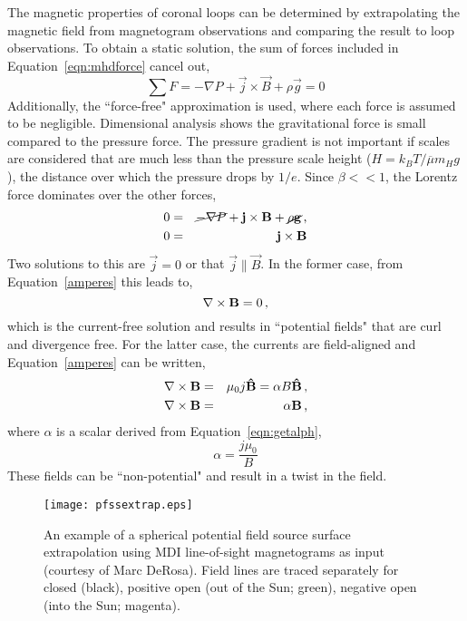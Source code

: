 The magnetic properties of coronal loops can be determined by extrapolating the magnetic field from magnetogram observations and comparing the result to loop observations. To obtain a static solution, the sum of forces included in Equation~\ref{eqn:mhdforce} cancel out, 
\begin{equation}
\sum F = -\nabla P + \vec{j} \times \vec{B} +\rho \vec{g} = 0  
\end{equation}
Additionally, the ``force-free" approximation is used, where each force is assumed to be negligible.  Dimensional analysis shows the gravitational force is small compared to the pressure force. The pressure gradient is not important if scales are considered that are much less than the pressure scale height ($H=k_B T/\overline{\mu} m_H g$), the distance over which the pressure drops by $1/e$. Since $\beta << 1$, the Lorentz force dominates over the other forces, 
\begin{eqnarray}
0 &=& \cancel{-\nabla P} + \vec{j} \times \vec{B} +\cancel{\rho \vec{g}} \mbox{\,,} \\
0 &=& \vec{j} \times \vec{B}  
\end{eqnarray}
Two solutions to this are $\vec{j}=0$ or that $\vec{j} \parallel \vec{B}$. In the former case, from Equation~\ref{amperes} this leads to,
\begin{equation}
\nabla \times \vec{B} =0 \mbox{\,,}
\end{equation}
which is the current-free solution and results in ``potential fields" that are curl and divergence free.
For the latter case, the currents are field-aligned and Equation~\ref{amperes} can be written,
\begin{eqnarray}
\label{eqn:getalph} \nabla \times \vec{B} &=& \mu_0 j \mathbf{\hat{B}} = \alpha B \mathbf{\hat{B}} \mbox{\,,} \\
\label{eqn:alphb} \nabla \times \vec{B} &=& \alpha \vec{B} \mbox{\,,}
\end{eqnarray}
where $\alpha$ is a scalar derived from Equation~\ref{eqn:getalph},
\begin{equation}
\alpha = \frac{j \mu_0}{B}   %
\end{equation}
These fields can be ``non-potential" and result in a twist in the field. 

\begin{figure}[!t]
\centerline{\texttt{[image: pfssextrap.eps]}}
\caption[An example of a potential field source surface extrapolation.]{An example of a spherical potential field source surface extrapolation using MDI line-of-sight magnetograms as input (courtesy of Marc DeRosa). Field lines are traced separately for closed (black), positive open (out of the Sun; green), negative open (into the Sun; magenta).}
\label{fig:pfssextrap}
\end{figure}

